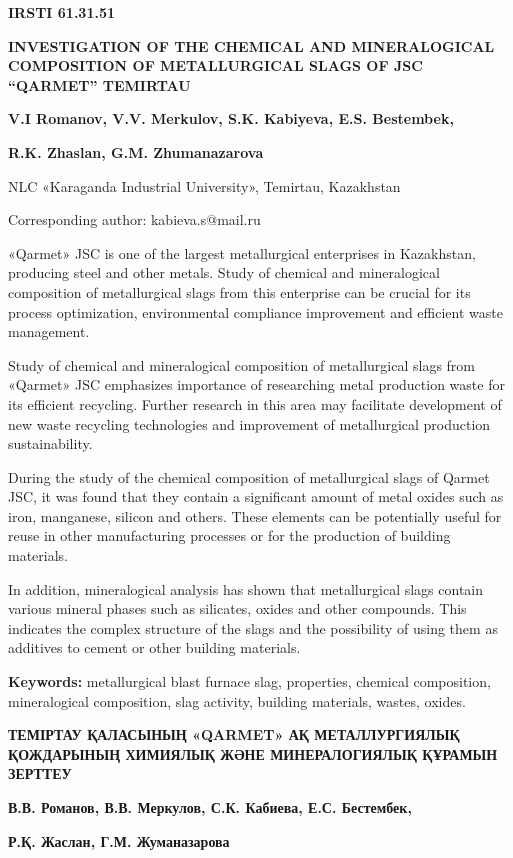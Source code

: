 \newpage
{\bfseries IRSTI 61.31.51}

{\bfseries INVESTIGATION OF THE CHEMICAL AND MINERALOGICAL COMPOSITION OF
METALLURGICAL SLAGS OF JSC ``QARMET'' TEMIRTAU}

{\bfseries V.I Romanov, V.V. Merkulov, S.K. Kabiyeva, E.S. Bestembek,}

{\bfseries R.K. Zhaslan, G.M. Zhumanazarova}

NLC «Karaganda Industrial University», Temirtau, Kazakhstan

Corresponding author: kabieva.s@mail.ru

«Qarmet» JSC is one of the largest metallurgical enterprises in
Kazakhstan, producing steel and other metals. Study of chemical and
mineralogical composition of metallurgical slags from this enterprise
can be crucial for its process optimization, environmental compliance
improvement and efficient waste management.

Study of chemical and mineralogical composition of metallurgical slags
from «Qarmet» JSC emphasizes importance of researching metal production
waste for its efficient recycling. Further research in this area may
facilitate development of new waste recycling technologies and
improvement of metallurgical production sustainability.

During the study of the chemical composition of metallurgical slags of
Qarmet JSC, it was found that they contain a significant amount of metal
oxides such as iron, manganese, silicon and others. These elements can
be potentially useful for reuse in other manufacturing processes or for
the production of building materials.

In addition, mineralogical analysis has shown that metallurgical slags
contain various mineral phases such as silicates, oxides and other
compounds. This indicates the complex structure of the slags and the
possibility of using them as additives to cement or other building
materials.

{\bfseries Keywords:} metallurgical blast furnace slag, properties,
chemical composition, mineralogical composition, slag activity, building
materials, wastes, oxides.

{\bfseries ТЕМІРТАУ ҚАЛАСЫНЫҢ «QARMET» АҚ МЕТАЛЛУРГИЯЛЫҚ ҚОЖДАРЫНЫҢ
ХИМИЯЛЫҚ ЖӘНЕ МИНЕРАЛОГИЯЛЫҚ ҚҰРАМЫН ЗЕРТТЕУ}

{\bfseries В.В. Романов, В.В. Меркулов, С.К. Кабиева, Е.С. Бестембек,}

{\bfseries Р.Қ. Жаслан, Г.М. Жуманазарова}

